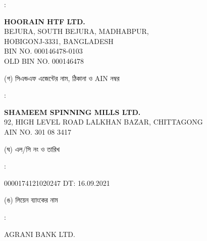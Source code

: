 \documentclass[12pt]{article}
\newcommand{\lcno}{0000174121020247}
\newcommand{\lcdt}{16.09.2021}
\newcommand{\lienbank}{AGRANI BANK LTD.}
\newcommand{\htf}{HOORAIN HTF LTD.}
\newcommand{\htfa}{BEJURA, SOUTH BEJURA, MADHABPUR,
\\
HOBIGONJ-3331, BANGLADESH
}
\newcommand{\impn}{\htf}
\newcommand{\impadd}{\htfa}
\newcommand{\impbin}{000146478-0103}
\newcommand{\impoldbin}{000146478}
\newcommand{\cnfn}{SHAMEEM SPINNING MILLS LTD.}
\newcommand{\cnfadd}{92, HIGH LEVEL ROAD
\newline
LALKHAN BAZAR, CHITTAGONG}
\newcommand{\cnfain}{301 08 3417}
\begin{document}
\begin{minipage}[t]{0.02\linewidth}
:
\end{minipage}
\begin{minipage}[t]{0.50\linewidth}
\textbf{{\impn}}
\\
{\impadd}
\\
BIN NO. {\impbin}
\\
OLD BIN NO. {\impoldbin}
\\
\end{minipage}
\begin{minipage}[t]{0.05\linewidth}
\hspace*{1em}
\end{minipage}
\begin{minipage}[t]{0.45\linewidth}
(গ) সিএন্ডএফ এজেন্টের নাম, ঠিকানা
ও AIN নম্বর
\end{minipage}
\begin{minipage}[t]{0.02\linewidth}
:
\end{minipage}
\begin{minipage}[t]{0.50\linewidth}
\textbf{{\cnfn}}
\\
{\cnfadd}
\\
AIN NO. {\cnfain}
\\
\end{minipage}
\begin{minipage}[t]{0.05\linewidth}
\hspace*{1em}
\end{minipage}
\begin{minipage}[t]{0.45\linewidth}
(ঘ) এল/সি নং ও তারিখ
\end{minipage}
\begin{minipage}[t]{0.02\linewidth}
:
\end{minipage}
\begin{minipage}[t]{0.50\linewidth}
{\lcno} \hspace{2em} DT: {\lcdt}
\\
\end{minipage}
\begin{minipage}[t]{0.05\linewidth}
\hspace*{1em}
\end{minipage}
\begin{minipage}[t]{0.45\linewidth}
(ঙ) লিয়েন ব্যাংকের নাম
\end{minipage}
\begin{minipage}[t]{0.02\linewidth}
:
\end{minipage}
\begin{minipage}[t]{0.50\linewidth}
{\lienbank}
\\
\end{minipage}
\end{document}
